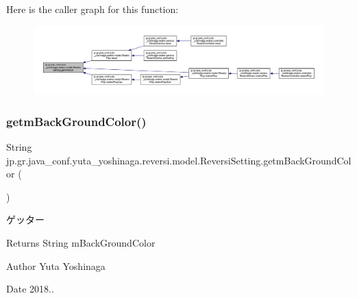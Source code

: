 Here is the caller graph for this function\+:
\nopagebreak
\begin{figure}[H]
\begin{center}
\leavevmode
\includegraphics[width=350pt]{classjp_1_1gr_1_1java__conf_1_1yuta__yoshinaga_1_1reversi_1_1model_1_1_reversi_setting_af2908862110772eff9fec1bcd153fd2e_icgraph}
\end{center}
\end{figure}
\mbox{\label{classjp_1_1gr_1_1java__conf_1_1yuta__yoshinaga_1_1reversi_1_1model_1_1_reversi_setting_a8b7d5e035f8d11b2acda13477cca5401}} 
\subsubsection{\texorpdfstring{getm\+Back\+Ground\+Color()}{getmBackGroundColor()}}
{\footnotesize\ttfamily String jp.\+gr.\+java\+\_\+conf.\+yuta\+\_\+yoshinaga.\+reversi.\+model.\+Reversi\+Setting.\+getm\+Back\+Ground\+Color (\begin{DoxyParamCaption}{ }\end{DoxyParamCaption})}



ゲッター 

\begin{DoxyReturn}{Returns}
String m\+Back\+Ground\+Color 
\end{DoxyReturn}
\begin{DoxyAuthor}{Author}
Yuta Yoshinaga 
\end{DoxyAuthor}
\begin{DoxyDate}{Date}
2018.. 
\end{DoxyDate}


